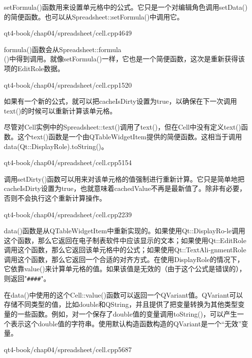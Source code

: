 \documentclass[11pt,oneside]{book}
\begin{document}
\begin{common-format}
setFormula()函数用来设置单元格中的公式。它只是一个对编辑角色调用setData()的简便函数。也可以从Spreadsheet::setFormula()中调用它。

\begin{cppline}{qt4-book/chap04/spreadsheet/cell.cpp}{46}{49}
\end{cppline}

formula()函数会从Spreadsheet::formula\\()中得到调用。就像setFormula()一样，它也是一个简便函数，这次是重新获得该项的EditRole数据。

\begin{cppline}{qt4-book/chap04/spreadsheet/cell.cpp}{15}{20}
\end{cppline}

如果有一个新的公式，就可以把cacheIsDirty设置为true，以确保在下一次调用text()的时候可以重新计算该单元格。

尽管对Cell实例中的Spreadsheet::text()调用了text()，但在Cell中没有定义text()函数。这个text()函数是一个由QTableWidgetItem提供的简便函数。这相当于调用data(Qt::DisplayRole).toString()。

\begin{cppline}{qt4-book/chap04/spreadsheet/cell.cpp}{51}{54}
\end{cppline}

调用setDirty()函数可以用来对该单元格的值强制进行重新计算。它只是简单地把cacheIsDirty设置为true，也就意味着cachedValue不再是最新值了。除非有必要，否则不会执行这个重新计算操作。

\begin{cppline}{qt4-book/chap04/spreadsheet/cell.cpp}{22}{39}
\end{cppline}

data()函数是从QTableWidgetItem中重新实现的。如果使用Qt::DisplayRo-le调用这个函数，那么它返回在电子制表软件中应该显示的文本；如果使用Qt::EditRole调用这个函数，那么它返回该单元格中的公式；如果使用Qt::TextAli-gnmentRole调用这个函数，那么它返回一个合适的对齐方式。在使用DisplayRole的情况下，它依靠value()来计算单元格的值。如果该值是无效的（由于这个公式是错误的），则返回"\verb+####+"。

在data()中使用的这个Cell::value()函数可以返回一个QVariant值。QVariant可以存储不同类型的值，比如double和QString，并且提供了把变量转换为其他类型变量的一些函数。例如，对一个保存了double值的变量调用toString()，可以产生一个表示这个double值的字符串。使用默认构造函数构造的QVariant是一个“无效”变量。

\begin{cppline}{qt4-book/chap04/spreadsheet/cell.cpp}{56}{87}
\end{cppline}


\end{common-format}
\end{document}
